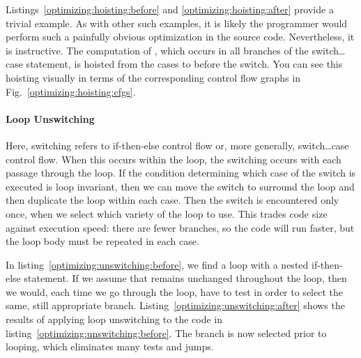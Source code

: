Listings~\ref{optimizing:hoisting:before} and \ref{optimizing:hoisting:after} provide a trivial example. As with other such examples, it is likely the programmer would perform such a painfully obvious optimization in the source code. Nevertheless, it is instructive. The computation of , which occurs in all branches of the switch\dots{}case statement, is hoisted from the cases to before the switch. You can see this hoisting visually in terms of the corresponding control flow graphs in Fig.~\ref{optimizing:hoisting:cfgs}.








\paragraph{Loop Unswitching}
Here, switching refers to if-then-else control flow or, more generally, switch\dots{}case control flow. When this occurs within the loop, the switching occurs with each passage through the loop. If the condition determining which case of the switch is executed is loop invariant, then we can move the switch to surround the loop and then duplicate the loop within each case. Then the switch is encountered only once, when we select which variety of the loop to use. This trades code size against execution speed: there are fewer branches, so the code will run faster, but the loop body must be repeated in each case.

In listing~\ref{optimizing:unswitching:before}, we find a loop with a nested if-then-else statement. If we assume that  remains unchanged throughout the loop, then we would, each time we go through the loop, have to test  in order to select the same, still appropriate branch. Listing~\ref{optimizing:unswitching:after} shows the results of applying loop unswitching to the code in listing~\ref{optimizing:unswitching:before}. The branch is now selected prior to looping, which eliminates many tests and jumps.

